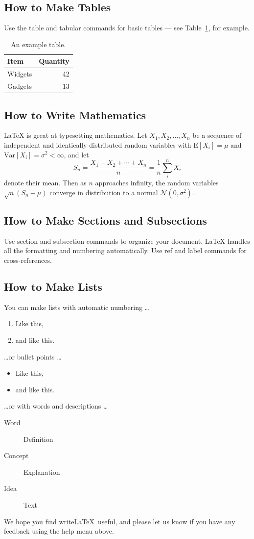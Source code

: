 \documentclass[a4paper]{article}
\begin{document}
\subsection{How to Make Tables}

Use the table and tabular commands for basic tables --- see Table~\ref{tab:widgets}, for example.

\begin{table}
\centering
\begin{tabular}{l|r}
Item & Quantity \\\hline
Widgets & 42 \\
Gadgets & 13
\end{tabular}
\caption{\label{tab:widgets}An example table.}
\end{table}

\subsection{How to Write Mathematics}

\LaTeX{} is great at typesetting mathematics. Let $X_1, X_2, \ldots, X_n$ be a sequence of independent and identically distributed random variables with $\text{E}[X_i] = \mu$ and $\text{Var}[X_i] = \sigma^2 < \infty$, and let
\begin{equation}
S_n = \frac{X_1 + X_2 + \cdots + X_n}{n}
      = \frac{1}{n}\sum_{i}^{n} X_i
\end{equation}
denote their mean. Then as $n$ approaches infinity, the random variables $\sqrt{n}(S_n - \mu)$ converge in distribution to a normal $\mathcal{N}(0, \sigma^2)$.

\subsection{How to Make Sections and Subsections}

Use section and subsection commands to organize your document. \LaTeX{} handles all the formatting and numbering automatically. Use ref and label commands for cross-references.

\subsection{How to Make Lists}

You can make lists with automatic numbering \dots

\begin{enumerate}
\item Like this,
\item and like this.
\end{enumerate}
\dots or bullet points \dots
\begin{itemize}
\item Like this,
\item and like this.
\end{itemize}
\dots or with words and descriptions \dots
\begin{description}
\item[Word] Definition
\item[Concept] Explanation
\item[Idea] Text
\end{description}

We hope you find write\LaTeX\ useful, and please let us know if you have any feedback using the help menu above.
\end{document}
